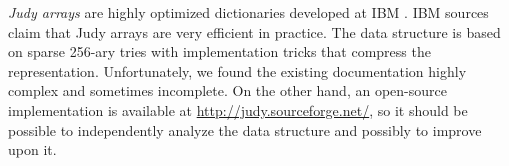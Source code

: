\emph{Judy arrays} are highly optimized dictionaries developed at IBM
\cite{judy-shop-manual, judy-patent}.
IBM sources claim that Judy arrays are very efficient in practice.
The data structure is based on sparse 256-ary tries with implementation tricks
that compress the representation.
Unfortunately, we found the existing documentation highly complex and sometimes
incomplete. On the other hand, an open-source implementation is available
at \url{http://judy.sourceforge.net/}, so it should be possible to independently
analyze the data structure and possibly to improve upon it.
